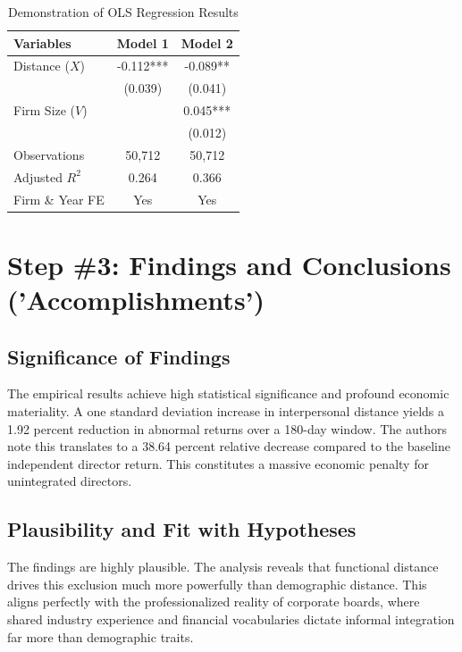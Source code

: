 \documentclass[11pt, a4paper]{article}
\begin{document}
\begin{table}[H]
	\centering
	\caption{Demonstration of OLS Regression Results}
	\vspace{0.2cm}
	\begin{tabular}{l c c}
		\toprule
		\textbf{Variables} & \textbf{Model 1} & \textbf{Model 2} \\
		\midrule
		Distance ($X$)     & -0.112***        & -0.089**         \\
		                   & (0.039)          & (0.041)          \\
		Firm Size ($V$)    &                  & 0.045***         \\
		                   &                  & (0.012)          \\
		\midrule
		Observations       & 50,712           & 50,712           \\
		Adjusted $R^2$     & 0.264            & 0.366            \\
		Firm \& Year FE    & Yes              & Yes              \\
		\bottomrule
	\end{tabular}
\end{table}

\section*{Step \#3: Findings and Conclusions ('Accomplishments')}

\subsection*{Significance of Findings}
The empirical results achieve high statistical significance and profound economic materiality. A one standard deviation increase in interpersonal distance yields a 1.92 percent reduction in abnormal returns over a 180-day window. The authors note this translates to a 38.64 percent relative decrease compared to the baseline independent director return. This constitutes a massive economic penalty for unintegrated directors.

\subsection*{Plausibility and Fit with Hypotheses}
The findings are highly plausible. The analysis reveals that functional distance drives this exclusion much more powerfully than demographic distance. This aligns perfectly with the professionalized reality of corporate boards, where shared industry experience and financial vocabularies dictate informal integration far more than demographic traits.
\end{document}
